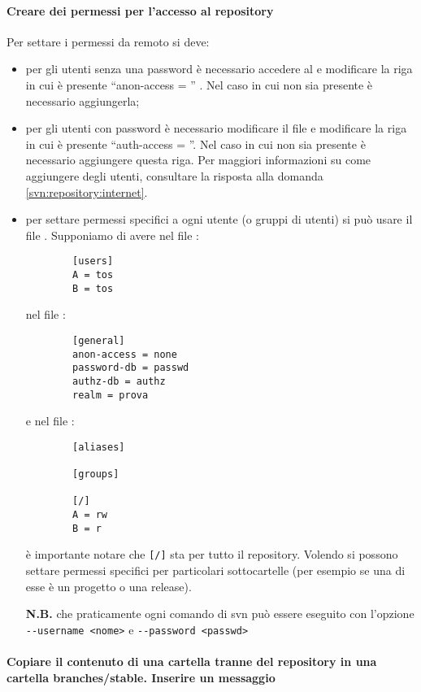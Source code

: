 \documentclass[a4paper]{article}
\begin{document}
	\paragraph{Creare dei permessi per l'accesso al repository}
	Per settare i permessi da remoto si deve:
	\begin{itemize}
		\item per gli utenti senza una password è necessario accedere al  e modificare la riga in cui è presente ``anon-access = '' . Nel caso in cui non sia presente è necessario aggiungerla;
		\item per gli utenti con password è necessario modificare il file  e modificare la riga in cui
		è presente ``auth-access = ''. Nel caso in cui non sia presente è necessario aggiungere questa riga.
		Per maggiori informazioni su come aggiungere degli utenti, consultare la risposta alla domanda \ref{svn:repository:internet}.
		
		\item per settare permessi specifici a ogni utente (o gruppi di utenti)
		si può usare il file .
		Supponiamo di avere nel file :
		\begin{verbatim}
		[users]
		A = tos
		B = tos
		\end{verbatim}
		nel file :
		\begin{verbatim}
		[general]
		anon-access = none
		password-db = passwd
		authz-db = authz
		realm = prova
		\end{verbatim}
		e nel file :
		\begin{verbatim}
		[aliases]
		
		[groups]
		
		[/]
		A = rw
		B = r
		\end{verbatim}
		è importante notare che \verb|[/]| sta per tutto il repository. Volendo
		si possono settare permessi specifici per particolari sottocartelle
		(per esempio se una di esse è un progetto o una release).
		
		\textbf{N.B.} che praticamente ogni comando di svn può essere eseguito
		con l'opzione \verb|--username <nome>| e \verb|--password <passwd>|
	\end{itemize}

	\paragraph{Copiare il contenuto di una cartella tranne del repository in una cartella branches/stable. Inserire un messaggio}
\end{document}
